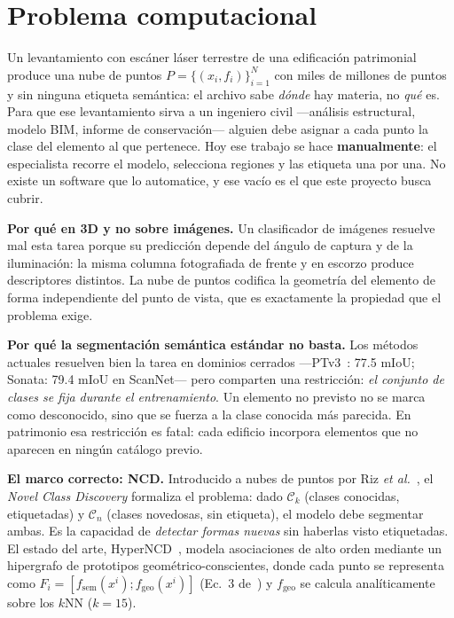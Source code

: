 \documentclass[9pt,twocolumn,a4paper]{extarticle}
\begin{document}
\section{Problema computacional}
Un levantamiento con escáner láser terrestre de una edificación patrimonial
produce una nube de puntos $P=\{(x_i,f_i)\}_{i=1}^{N}$ con miles de millones
de puntos y sin ninguna etiqueta semántica: el archivo sabe \emph{dónde} hay
materia, no \emph{qué} es. Para que ese levantamiento sirva a un ingeniero
civil ---análisis estructural, modelo BIM, informe de conservación--- alguien
debe asignar a cada punto la clase del elemento al que pertenece. Hoy ese
trabajo se hace \textbf{manualmente}: el especialista recorre el modelo,
selecciona regiones y las etiqueta una por una. No existe un software que lo
automatice, y ese vacío es el que este proyecto busca cubrir.

\textbf{Por qué en 3D y no sobre imágenes.} Un clasificador de imágenes
resuelve mal esta tarea porque su predicción depende del ángulo de captura y
de la iluminación: la misma columna fotografiada de frente y en escorzo
produce descriptores distintos. La nube de puntos codifica la geometría del
elemento de forma independiente del punto de vista, que es exactamente la
propiedad que el problema exige.

\textbf{Por qué la segmentación semántica estándar no basta.} Los métodos
actuales resuelven bien la tarea en dominios cerrados ---PTv3~\cite{ptv3}:
77.5 mIoU; Sonata: 79.4 mIoU en ScanNet--- pero comparten una restricción:
\emph{el conjunto de clases se fija durante el entrenamiento}. Un elemento no
previsto no se marca como desconocido, sino que se fuerza a la clase conocida
más parecida. En patrimonio esa restricción es fatal: cada edificio incorpora
elementos que no aparecen en ningún catálogo previo.

\textbf{El marco correcto: NCD.} Introducido a nubes de puntos por Riz
\emph{et al.}~\cite{nops}, el \emph{Novel Class Discovery} formaliza el
problema: dado $\mathcal{C}_k$ (clases conocidas, etiquetadas) y
$\mathcal{C}_n$ (clases novedosas, sin etiqueta), el modelo debe segmentar
ambas. Es la capacidad de \emph{detectar formas nuevas} sin haberlas visto
etiquetadas. El estado del arte, HyperNCD~\cite{hyperncd}, modela
asociaciones de alto orden mediante un hipergrafo de prototipos
geométrico-conscientes, donde cada punto se representa como
$F_i=[f_{\mathrm{sem}}(x^i);f_{\mathrm{geo}}(x^i)]$ (Ec.~3 de~\cite{hyperncd})
y $f_{\mathrm{geo}}$ se calcula analíticamente sobre los $k$NN ($k{=}15$).
\end{document}
